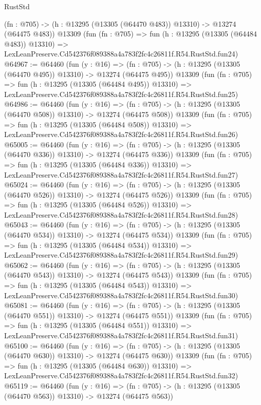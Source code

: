 \begin{lexlean}{RustStd}
\begin{coremodule}
    (fn : @705) -> (h : @13295 (@13305 (@64470 @483)) @13310) -> @13274 (@64475 @483))
    @13309
    (fun (fn : @705) =>
    fun (h : @13295 (@13305 (@64484 @483)) @13310) =>
    LexLeanPreserve.Cd542376f089388a4a783f2fc4c26811f.R54.RustStd.fun24)
@64967 := @64460
    (fun (y : @16) =>
    (fn : @705) -> (h : @13295 (@13305 (@64470 @495)) @13310) -> @13274 (@64475 @495))
    @13309
    (fun (fn : @705) =>
    fun (h : @13295 (@13305 (@64484 @495)) @13310) =>
    LexLeanPreserve.Cd542376f089388a4a783f2fc4c26811f.R54.RustStd.fun25)
@64986 := @64460
    (fun (y : @16) =>
    (fn : @705) -> (h : @13295 (@13305 (@64470 @508)) @13310) -> @13274 (@64475 @508))
    @13309
    (fun (fn : @705) =>
    fun (h : @13295 (@13305 (@64484 @508)) @13310) =>
    LexLeanPreserve.Cd542376f089388a4a783f2fc4c26811f.R54.RustStd.fun26)
@65005 := @64460
    (fun (y : @16) =>
    (fn : @705) -> (h : @13295 (@13305 (@64470 @336)) @13310) -> @13274 (@64475 @336))
    @13309
    (fun (fn : @705) =>
    fun (h : @13295 (@13305 (@64484 @336)) @13310) =>
    LexLeanPreserve.Cd542376f089388a4a783f2fc4c26811f.R54.RustStd.fun27)
@65024 := @64460
    (fun (y : @16) =>
    (fn : @705) -> (h : @13295 (@13305 (@64470 @526)) @13310) -> @13274 (@64475 @526))
    @13309
    (fun (fn : @705) =>
    fun (h : @13295 (@13305 (@64484 @526)) @13310) =>
    LexLeanPreserve.Cd542376f089388a4a783f2fc4c26811f.R54.RustStd.fun28)
@65043 := @64460
    (fun (y : @16) =>
    (fn : @705) -> (h : @13295 (@13305 (@64470 @534)) @13310) -> @13274 (@64475 @534))
    @13309
    (fun (fn : @705) =>
    fun (h : @13295 (@13305 (@64484 @534)) @13310) =>
    LexLeanPreserve.Cd542376f089388a4a783f2fc4c26811f.R54.RustStd.fun29)
@65062 := @64460
    (fun (y : @16) =>
    (fn : @705) -> (h : @13295 (@13305 (@64470 @543)) @13310) -> @13274 (@64475 @543))
    @13309
    (fun (fn : @705) =>
    fun (h : @13295 (@13305 (@64484 @543)) @13310) =>
    LexLeanPreserve.Cd542376f089388a4a783f2fc4c26811f.R54.RustStd.fun30)
@65081 := @64460
    (fun (y : @16) =>
    (fn : @705) -> (h : @13295 (@13305 (@64470 @551)) @13310) -> @13274 (@64475 @551))
    @13309
    (fun (fn : @705) =>
    fun (h : @13295 (@13305 (@64484 @551)) @13310) =>
    LexLeanPreserve.Cd542376f089388a4a783f2fc4c26811f.R54.RustStd.fun31)
@65100 := @64460
    (fun (y : @16) =>
    (fn : @705) -> (h : @13295 (@13305 (@64470 @630)) @13310) -> @13274 (@64475 @630))
    @13309
    (fun (fn : @705) =>
    fun (h : @13295 (@13305 (@64484 @630)) @13310) =>
    LexLeanPreserve.Cd542376f089388a4a783f2fc4c26811f.R54.RustStd.fun32)
@65119 := @64460
    (fun (y : @16) =>
    (fn : @705) -> (h : @13295 (@13305 (@64470 @563)) @13310) -> @13274 (@64475 @563))

\end{coremodule}
\end{lexlean}
